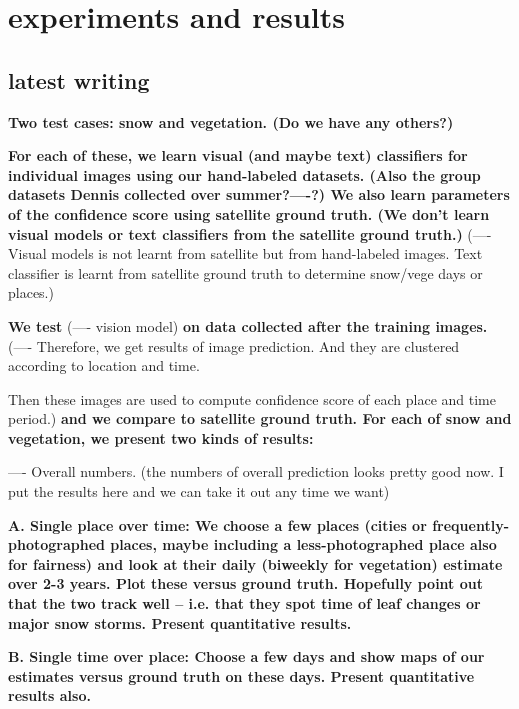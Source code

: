 \section{experiments and results}


\hfill \break
\hfill \break
\subsection*{latest writing}
\hfill \break
\hfill \break

\textbf{
Two test cases: snow and vegetation. (Do we have any others?)
}

\textbf{
For each of these, we learn visual (and maybe text) classifiers for individual images using our hand-labeled datasets. (Also the group datasets Dennis collected over summer?----?) We also learn parameters of the confidence score using satellite ground truth. (We don't learn visual models or text classifiers from the satellite ground truth.)}
(---- Visual models  is not learnt from satellite but from hand-labeled images. Text classifier is learnt from satellite ground truth to determine snow/vege days or places.) 

\textbf{We test }
(---- vision model) 
\textbf{on data collected after the training images.}                                             
(---- Therefore, we get results of image prediction. And they are clustered according to location and time. 

Then these images are used to compute confidence score of each place and time period.)
\textbf{and we compare to satellite ground truth. For each of snow and vegetation, we present two kinds of results:}

---- Overall numbers.
 (the numbers of overall prediction looks pretty good now. I put the results here and we can take it out any time we want)

\textbf{
A. Single place over time: We choose a few places (cities or frequently-photographed places, maybe including a less-photographed place also for fairness) and look at their daily (biweekly for vegetation) estimate over 2-3 years. Plot these versus ground truth. Hopefully point out that the two track well -- i.e. that they spot time of leaf changes or major snow storms. Present quantitative results.
}

\textbf{
B. Single time over place: Choose a few days and show maps of our estimates versus ground truth on these days. Present quantitative results also.
}

